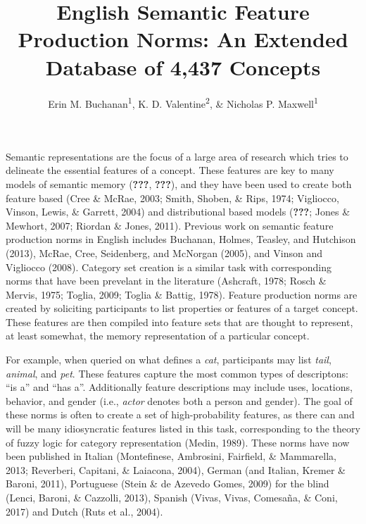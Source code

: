 \documentclass[english,man]{apa6}
\title{English Semantic Feature Production Norms: An Extended Database of 4,437
Concepts}
\author{Erin M. Buchanan\textsuperscript{1}, K. D. Valentine\textsuperscript{2}, \& Nicholas P. Maxwell\textsuperscript{1}}
\affiliation{
    \vspace{0.5cm}
          \textsuperscript{1} Missouri State University\\
          \textsuperscript{2} University of Missouri  }
\theoremstyle{definition}
\theoremstyle{definition}
\theoremstyle{definition}
\theoremstyle{remark}
\begin{document}
\maketitle

\setcounter{secnumdepth}{0}



Semantic representations are the focus of a large area of research which
tries to delineate the essential features of a concept. These features
are key to many models of semantic memory ({\textbf{???}},
{\textbf{???}}), and they have been used to create both feature based
(Cree \& McRae, 2003; Smith, Shoben, \& Rips, 1974; Vigliocco, Vinson,
Lewis, \& Garrett, 2004) and distributional based models
({\textbf{???}}; Jones \& Mewhort, 2007; Riordan \& Jones, 2011).
Previous work on semantic feature production norms in English includes
Buchanan, Holmes, Teasley, and Hutchison (2013), McRae, Cree,
Seidenberg, and McNorgan (2005), and Vinson and Vigliocco (2008).
Category set creation is a similar task with corresponding norms that
have been prevelant in the literature (Ashcraft, 1978; Rosch \& Mervis,
1975; Toglia, 2009; Toglia \& Battig, 1978). Feature production norms
are created by soliciting participants to list properties or features of
a target concept. These features are then compiled into feature sets
that are thought to represent, at least somewhat, the memory
representation of a particular concept.

For example, when queried on what defines a \emph{cat}, participants may
list \emph{tail}, \emph{animal}, and \emph{pet}. These features capture
the most common types of descriptons: \enquote{is a} and \enquote{has
a}. Additionally feature descriptions may include uses, locations,
behavior, and gender (i.e., \emph{actor} denotes both a person and
gender). The goal of these norms is often to create a set of
high-probability features, as there can and will be many idiosyncratic
features listed in this task, corresponding to the theory of fuzzy logic
for category representation (Medin, 1989). These norms have now been
published in Italian (Montefinese, Ambrosini, Fairfield, \& Mammarella,
2013; Reverberi, Capitani, \& Laiacona, 2004), German (and Italian,
Kremer \& Baroni, 2011), Portuguese (Stein \& de Azevedo Gomes, 2009)
for the blind (Lenci, Baroni, \& Cazzolli, 2013), Spanish (Vivas, Vivas,
Comesaña, \& Coni, 2017) and Dutch (Ruts et al., 2004).
\end{document}
